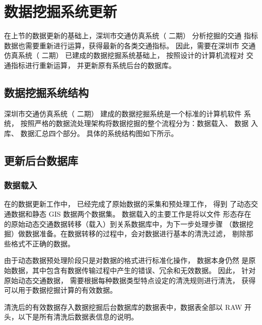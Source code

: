 

\chapter{数据挖掘系统更新}
在上节的数据更新的基础上，深圳市交通仿真系统（ 二期） 分析挖掘的交通
指标数据也需要重新进行运算，获得最新的各类交通指标。 因此，需要在深圳市
交通仿真系统（ 二期） 已建成的数据挖掘系统基础上， 按照设计的计算机流程对
交通指标进行重新运算， 并更新原有系统后台的数据库。

\section{数据挖掘系统结构}
深圳市交通仿真系统（ 二期） 建成的数据挖掘系统是一个标准的计算机软件
系统， 按照严格的数据流处理架构将数据挖掘的整个流程分为：数据载入、 数据
入库、 数据汇总四个部分。 具体的系统结构图如下所示。

\section{更新后台数据库}
\subsection{数据载入}
在的数据更新工作中， 已经完成了原始数据的采集和预处理工作， 得到
了动态交通数据和静态 GIS 数据两个数据集。 数据载入的主要工作是将以文件
形态存在的原始动态交通数据转移（载入）到关系数据库中，为下一步处理步骤
（数据挖掘）做数据准备。在数据转移的过程中，会对数据进行基本的清洗过滤，
剔除那些格式不正确的数据。

由于动态数据预处理阶段只是对数据的格式进行标准化操作， 数据本身仍然
是原始数据，其中包含有数据传输过程中产生的错误、冗余和无效数据。 因此，
针对原始动态交通数据， 需要根据每种数据类型特点设定的清洗规则进行清洗，
获得可以用于数据挖掘计算的有效数据。

清洗后的有效数据存入数据挖掘后台数据库的数据表中，数据表全部以
RAW 开头，以下是所有清洗后数据表信息的说明。

